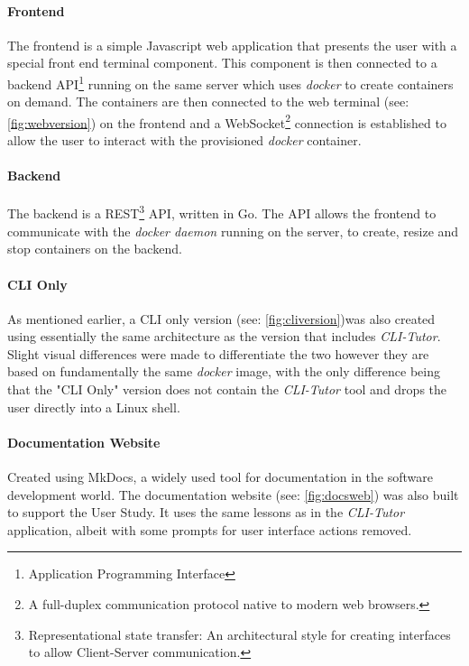 \paragraph{Frontend} The frontend is a simple Javascript web application that
presents the user with a special front end terminal component. This component
is then connected to a backend API\footnote{Application Programming Interface}
running on the same server which uses \textit{docker} to create containers on
demand. The containers are then connected to the web terminal (see: \autoref{fig:webversion}) on the frontend
and a WebSocket\footnote{A full-duplex communication protocol native to modern
web browsers.} connection is established to allow the user to interact
with the provisioned \textit{docker} container.

\paragraph{Backend} The backend is a REST\footnote{Representational state
transfer: An architectural style for creating interfaces to allow Client-Server
communication.} API, written in Go. The API allows the frontend to communicate
with the \textit{docker daemon} running on the server, to create,
resize and stop containers on the backend.
 
\paragraph{CLI Only} As mentioned earlier, a CLI only version (see: \autoref{fig:cliversion})was also created
using essentially the same architecture as the version that includes
\textit{CLI-Tutor}. Slight visual differences were made to differentiate the
two however they are based on fundamentally the same \textit{docker} image, with
the only difference being that the "CLI Only" version does not contain the
\textit{CLI-Tutor} tool and drops the user directly into a Linux shell.

\paragraph{Documentation Website} Created using MkDocs,\cite{mkdocs} a widely
used tool for documentation in the software development world. The
documentation website (see: \autoref{fig:docsweb}) was also built to support the
User Study. It uses the same lessons as in the \textit{CLI-Tutor}
application, albeit with some prompts for user interface actions removed.

